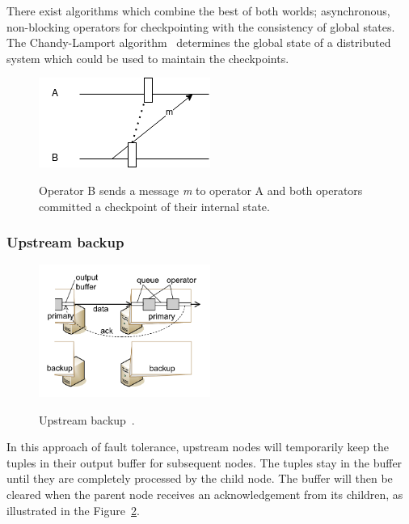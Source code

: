 There exist algorithms which combine the best of both worlds; asynchronous, non-blocking
operators for checkpointing with the consistency of global states. 
The Chandy-Lamport algorithm~\cite{chandy_lamport} determines the 
global state of a distributed system which could be used to maintain the checkpoints. 

\begin{figure}[!htbp]
    \centering
    \includegraphics{fig/checkpoint_inconsistency.png}
    \label{fig:checkpoint_inconsistency}
    \caption{Operator B sends a message \emph{m} to operator A and both operators 
    committed a checkpoint of their internal state.}
\end{figure}

\subsubsection{Upstream backup}

\begin{figure}[!htbp]
    \centering
    \includegraphics[width=0.5\textwidth]{fig/upstream.png}
    \label{fig:upstream}
    \caption{Upstream backup~\cite{upstream_backup}. }
    
\end{figure}


In this approach of fault tolerance, upstream nodes
 will temporarily 
keep the tuples in their output buffer for subsequent nodes. The tuples 
stay in the buffer until they are completely processed by the child node. 
The buffer will then be cleared when the parent node receives 
an acknowledgement from its children, as illustrated in the Figure~\ref{fig:upstream}. 

